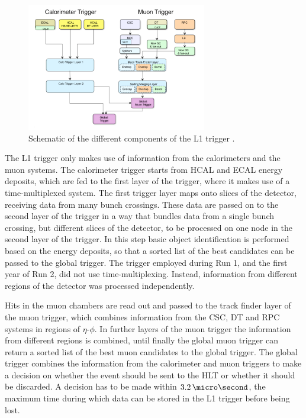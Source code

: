 \begin{figure}[h!]
\begin{center}
\includegraphics[width=0.7\textwidth]{./Detector/Plots/CMSTrigger.png}
\caption[Schematic of the different components of the L1 trigger.]{Schematic of the different components of the \ac{L1} trigger \cite{cms-trigger-tdr}.}
\label{fig:CMS_Trigger}
\end{center}
\end{figure}

The \ac{L1} trigger only makes use of information from the calorimeters and the muon systems.
The calorimeter trigger starts from \ac{HCAL} and \ac{ECAL} energy deposits, 
which are fed to the first layer of the trigger, where it makes use of a time-multiplexed system. 
The first trigger layer maps onto slices of the detector, receiving data from many bunch crossings. These data are passed
on to the second layer of the trigger in a way that bundles data from a single bunch crossing, but
different slices of the detector, to be processed on one node in the second layer of the
trigger. In this step basic object identification is performed based on the energy
deposits, so that a sorted list of the best candidates can be passed to the global trigger.
The trigger employed during Run 1, and the first year of Run 2, did not use time-multiplexing. Instead, 
information from different regions of the detector was processed independently.

Hits in the muon chambers are read out and passed to the track finder layer 
of the muon trigger, which combines information from the CSC, DT
and RPC systems in regions of $\eta$-$\phi$.
In further layers of the muon trigger the information from different
regions is combined, until finally the global muon trigger
can return a sorted list of the best muon candidates to the global trigger.
The global trigger combines the information from the calorimeter and muon triggers
to make a decision on whether the event should be sent to the \ac{HLT} or whether
it should be discarded. A decision has to be made within $3.2\,\micro\second$, the maximum time during
which data can be stored in the \ac{L1} trigger before being lost.

